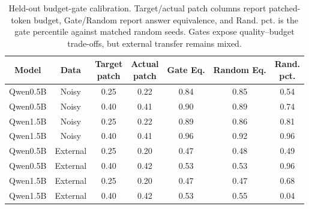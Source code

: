 \begin{table}[t]
\centering
\footnotesize
\begin{adjustbox}{max width=\textwidth}
\begin{tabular}{ccccccc}
\toprule
Model & Data & \shortstack{Target\\patch} & \shortstack{Actual\\patch} & Gate Eq. & Random Eq. & \shortstack{Rand.\\pct.} \\
\midrule
Qwen0.5B & Noisy & 0.25 & 0.22 & 0.84 & 0.85 & 0.54 \\
Qwen0.5B & Noisy & 0.40 & 0.41 & 0.90 & 0.89 & 0.74 \\
Qwen1.5B & Noisy & 0.25 & 0.22 & 0.89 & 0.86 & 0.81 \\
Qwen1.5B & Noisy & 0.40 & 0.41 & 0.96 & 0.92 & 0.96 \\
Qwen0.5B & External & 0.25 & 0.20 & 0.47 & 0.48 & 0.49 \\
Qwen0.5B & External & 0.40 & 0.42 & 0.53 & 0.53 & 0.96 \\
Qwen1.5B & External & 0.25 & 0.20 & 0.47 & 0.47 & 0.68 \\
Qwen1.5B & External & 0.40 & 0.42 & 0.53 & 0.55 & 0.04 \\
\bottomrule
\end{tabular}
\end{adjustbox}
\caption{Held-out budget-gate calibration. Target/actual patch columns report patched-token budget, Gate/Random report answer equivalence, and Rand. pct. is the gate percentile against matched random seeds. Gates expose quality--budget trade-offs, but external transfer remains mixed.}
\label{tab:budget-summary}
\end{table}
